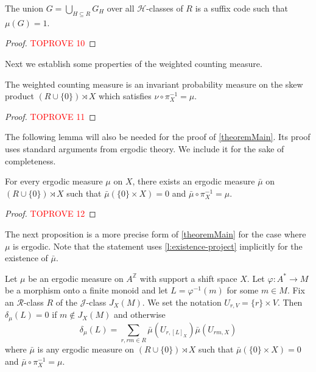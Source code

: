 \documentclass[a4paper,UKenglish,numberwithinsect,cleveref]{lipics-v2021}
\newcommand{\HH}{\mathrel{\mathscr{H}}}
\newcommand{\JJ}{\mathrel{\mathscr{J}}}
\newcommand{\RR}{\mathrel{\mathscr{R}}}
\newcommand{\Z}{\mathbb{Z}}
\begin{document}
\begin{lemma}\label{lemmaGr}
    The union $G = \bigcup_{H\subseteq R}G_H$ over all $\HH$-classes of $R$ is a suffix code such that $\mu(G)=1$.
\end{lemma}

\begin{proof}\textcolor{red}{TOPROVE 10}\end{proof}

Next we establish some properties of the weighted counting measure.

\begin{proposition}\label{p:weighted-counting}
    The weighted counting measure is an invariant probability measure on the skew product $(R\cup\{0\})\rtimes X$ which satisfies $\nu\circ\pi_X^{-1} = \mu$.
\end{proposition}

\begin{proof}\textcolor{red}{TOPROVE 11}\end{proof}

The following lemma will also be needed for the proof of \cref{theoremMain}. Its proof uses standard arguments from ergodic theory. We include it for the sake of completeness.

\begin{lemma}\label{l:existence-project}
    For every ergodic measure $\mu$ on $X$, there exists an ergodic measure $\bar\mu$ on $(R\cup\{0\})\rtimes X$ such that $\bar\mu(\{0\}\times X) = 0$ and $\bar\mu\circ\pi_X^{-1}=\mu$.
\end{lemma}

\begin{proof}\textcolor{red}{TOPROVE 12}\end{proof}

The next proposition is a more precise form of \cref{theoremMain} for the case where $\mu$ is ergodic. Note that the statement uses \cref{l:existence-project} implicitly
for the existence of $\bar\mu$.
\begin{proposition}\label{propositionDensityMonoid} 
    Let $\mu$ be an ergodic measure on $A^\Z$ with support a shift space $X$. Let $\varphi\colon A^*\to M$ be a morphism onto a finite monoid and let $L=\varphi^{-1}(m)$ for some $m\in M$.  Fix an $\RR$-class $R$ of the $\JJ$-class $J_X(M)$. We set  the notation $U_{r,V}=\{r\}\times V$. Then $\delta_\mu(L)=0$ if $m\notin J_X(M)$ and otherwise
    \begin{equation}
        \delta_\mu(L)= \sum_{r,rm\in R}\bar\mu(U_{r,[L]_X})\bar\mu(U_{rm,X})
        \label{eqDensityRationalLanguage}
    \end{equation}
    where $\bar\mu$ is any ergodic measure on $(R\cup\{0\})\rtimes X$ such that $\bar\mu(\{0\}\times X)=0$ and $\bar\mu\circ\pi_X^{-1} = \mu$.
\end{proposition}
\end{document}
